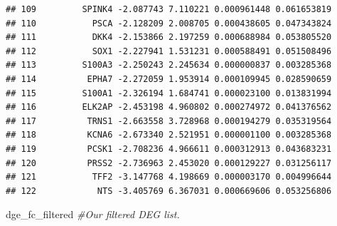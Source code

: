\documentclass[
]{article}
\newenvironment{Shaded}{\begin{snugshade}}{\end{snugshade}}
\newcommand{\CommentTok}[1]{\textcolor[rgb]{0.56,0.35,0.01}{\textit{#1}}}
\newcommand{\NormalTok}[1]{#1}
\begin{document}
\begin{verbatim}
## 109         SPINK4 -2.087743 7.110221 0.000961448 0.061653819
## 110           PSCA -2.128209 2.008705 0.000438605 0.047343824
## 111           DKK4 -2.153866 2.197259 0.000688984 0.053805520
## 112           SOX1 -2.227941 1.531231 0.000588491 0.051508496
## 113         S100A3 -2.250243 2.245634 0.000000837 0.003285368
## 114          EPHA7 -2.272059 1.953914 0.000109945 0.028590659
## 115         S100A1 -2.326194 1.684741 0.000023100 0.013831994
## 116         ELK2AP -2.453198 4.960802 0.000274972 0.041376562
## 117          TRNS1 -2.663558 3.728968 0.000194279 0.035319564
## 118          KCNA6 -2.673340 2.521951 0.000001100 0.003285368
## 119          PCSK1 -2.708236 4.966611 0.000312913 0.043683231
## 120          PRSS2 -2.736963 2.453020 0.000129227 0.031256117
## 121           TFF2 -3.147768 4.198669 0.000003170 0.004996644
## 122            NTS -3.405769 6.367031 0.000669606 0.053256806
\end{verbatim}

\begin{Shaded}
\begin{Highlighting}[]
\NormalTok{dge\_fc\_filtered }\CommentTok{\#Our filtered DEG list.}
\end{Highlighting}
\end{Shaded}
\end{document}
